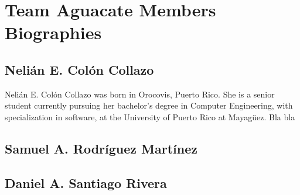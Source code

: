 \section{Team Aguacate Members Biographies}

\subsection{Nelián E. Colón Collazo}
Nelián E. Colón Collazo was born in Orocovis, Puerto Rico.  She is a senior student currently pursuing her bachelor's degree in Computer Engineering, with specialization in software, at the University of Puerto Rico at Mayagüez.  Bla bla

\subsection{Samuel A. Rodríguez Martínez}

\subsection{Daniel A. Santiago Rivera}


